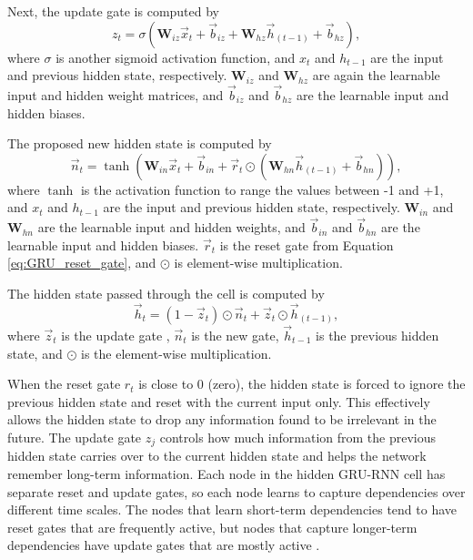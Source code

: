 Next, the update gate is computed by
\begin{equation} \label{eq:GRU_update_gate}
	z_{t} = \sigma\left(\textbf{W}_{iz} \vec{x}_{t} + \vec{b}_{iz} + \textbf{W}_{hz} \vec{h}_{\left(t-1\right)} + \vec{b}_{hz}\right),
\end{equation}
where $\sigma$ is another sigmoid activation function, and $x_{t}$ and $h_{t-1}$ are the input and previous hidden state, respectively. $\textbf{W}_{iz}$ and $\textbf{W}_{hz}$ are again the learnable input and hidden weight matrices, and $\vec{b}_{iz}$ and $\vec{b}_{hz}$ are the learnable input and hidden biases.

The proposed new hidden state is computed by
\begin{equation} \label{eq:GRU_new_gate}
		\vec{n}_{t} = \tanh\left(\textbf{W}_{in} \vec{x}_{t} + \vec{b}_{in} + \vec{r}_{t} \odot \left(\textbf{W}_{hn} \vec{h}_{\left(t-1\right)} + \vec{b}_{hn}\right)\right),
\end{equation}
where $\tanh$ is the activation function to range the values between -1 and +1, and $x_{t}$ and $h_{t-1}$ are the input and previous hidden state, respectively. $\textbf{W}_{in}$ and $\textbf{W}_{hn}$ are the learnable input and hidden weights, and $\vec{b}_{in}$ and $\vec{b}_{hn}$ are the learnable input and hidden biases. $\vec{r}_{t}$ is the reset gate from Equation \ref{eq:GRU_reset_gate}, and $\odot$ is element-wise multiplication.

The hidden state passed through the cell is computed by
\begin{equation} \label{eq:GRU_new_hidden_state}
	\vec{h}_{t} = \left(1 - \vec{z}_{t}\right) \odot \vec{n}_{t} + \vec{z}_{t} \odot \vec{h}_{\left(t-1\right)},
\end{equation}
where $\vec{z}_{t}$ is the update gate , $\vec{n}_{t}$ is the new gate, $\vec{h}_{t-1}$ is the previous hidden state, and $\odot$ is the element-wise multiplication.

When the reset gate $r_{t}$ is close to 0 (zero), the hidden state is forced to ignore the previous hidden state and reset with the current input only. This effectively allows the hidden state to drop any information found to be irrelevant in the future. The update gate $z_{j}$ controls how much information from the previous hidden state carries over to the current hidden state and helps the network remember long-term information. Each node in the hidden \ac{GRU-RNN} cell has separate reset and update gates, so each node learns to capture dependencies over different time scales. The nodes that learn short-term dependencies tend to have reset gates that are frequently active, but nodes that capture longer-term dependencies have update gates that are mostly active \cite{GRU_original}.

